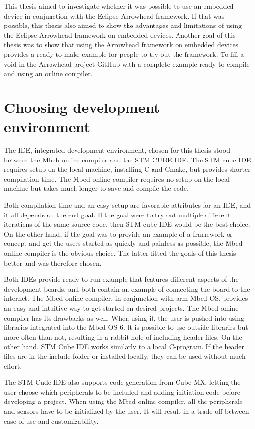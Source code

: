 This thesis aimed to investigate whether it was possible to use an embedded device in conjunction with the Eclipse Arrowhead framework.
If that was possible, this thesis also aimed to show the advantages and limitations of using the Eclipse Arrowhead framework on embedded devices.
Another goal of this thesis was to show that using the Arrowhead framework on embedded devices provides a ready-to-make example for people to try out the framework.
To fill a void in the Arrowhead project GitHub with a complete example ready to compile and using an online compiler.

\section{Choosing development environment}
The IDE, integrated development environment, chosen for this thesis stood between the Mbeb online compiler and the STM CUBE IDE. 
The STM cube IDE requires setup on the local machine, installing C and Cmake, but provides shorter compilation time.
The Mbed online compiler requires no setup on the local machine but takes much longer to save and compile the code.

Both compilation time and an easy setup are favorable attributes for an IDE, and it all depends on the end goal.
If the goal were to try out multiple different iterations of the same source code, then STM cube IDE would be the best choice.
On the other hand, if the goal was to provide an example of a framework or concept and get the users started as quickly and painless as possible, the Mbed online compiler is the obvious choice.
The latter fitted the goals of this thesis better and was therefore chosen. 

Both IDEs provide ready to run example that features different aspects of the development boards, and both contain an example of connecting the board to the internet.
The Mbed online compiler, in conjunction with arm Mbed OS, provides an easy and intuitive way to get started on desired projects.
The Mbed online compiler has its drawbacks as well. When using it, the user is pushed into using libraries integrated into the Mbed OS 6.
It is possible to use outside libraries but more often than not, resulting in a rabbit hole of including header files.
On the other hand, STM Cube IDE works similarly to a local C-program. If the header files are in the include folder or installed locally, they can be used without much effort.

The STM Cude IDE also supports code generation from Cube MX, letting the user choose which peripherals to be included and adding initiation code before developing a project.
When using the Mbed online compiler, all the peripherals and sensors have to be initialized by the user.
It will result in a trade-off between ease of use and customizability.

